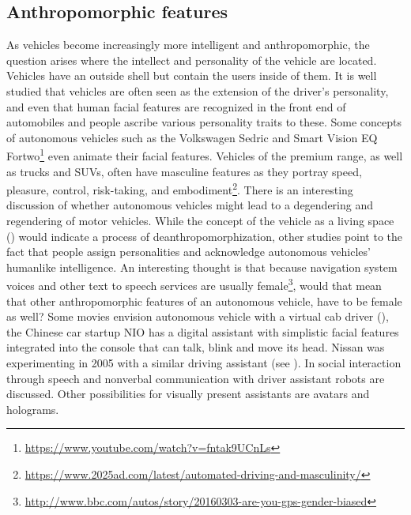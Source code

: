 \subsection{Anthropomorphic features}
As vehicles become increasingly more intelligent and anthropomorphic, the question arises where the intellect and personality of the vehicle are located. Vehicles have an outside shell but contain the users inside of them. It is well studied that vehicles are often seen as the extension of the driver's personality, and even that human facial features are recognized in the front end of automobiles and people ascribe various personality traits to these\cite{Windhager2008FaceDesigns}. Some concepts of autonomous vehicles such as the Volkswagen Sedric and Smart Vision EQ Fortwo\footnote{\url{https://www.youtube.com/watch?v=fntak9UCnLs}} even animate their facial features. Vehicles of the premium range, as well as trucks and SUVs, often have masculine features as they portray speed, pleasure, control, risk-taking, and embodiment\footnote{\url{https://www.2025ad.com/latest/automated-driving-and-masculinity/}}. There is an interesting discussion of whether autonomous vehicles might lead to a degendering and regendering of motor vehicles\cite{Balkmar2018}.
While the concept of the vehicle as a living space () would indicate a process of deanthropomorphization, other studies point to the fact that people assign personalities and acknowledge autonomous vehicles’ humanlike intelligence\cite{Waytz2014}. An interesting thought is that because navigation system voices and other text to speech services are usually female\footnote{\url{http://www.bbc.com/autos/story/20160303-are-you-gps-gender-biased}}, would that mean that other anthropomorphic features of an autonomous vehicle, have to be female as well? 
Some movies envision autonomous vehicle with a virtual cab driver (), the Chinese car startup NIO has a digital assistant with simplistic facial features integrated into the console that can talk, blink and move its head. Nissan was experimenting in 2005 with a similar driving assistant (see ). In \cite{Perchonok2009FacilitatingLiterature} social interaction through speech and nonverbal communication with driver assistant robots are discussed. Other possibilities for visually present assistants are avatars and holograms. 
